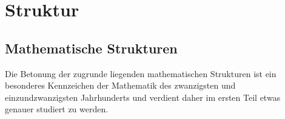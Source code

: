 %
%
%
\part{Struktur}

\chapter*{Mathematische Strukturen}
\rhead{}

Die Betonung der zugrunde liegenden mathematischen Strukturen ist
ein besonderes Kennzeichen der Mathematik des zwanzigsten und 
einzundzwanzigsten Jahrhunderts und verdient daher im ersten Teil
etwas genauer studiert zu werden.

